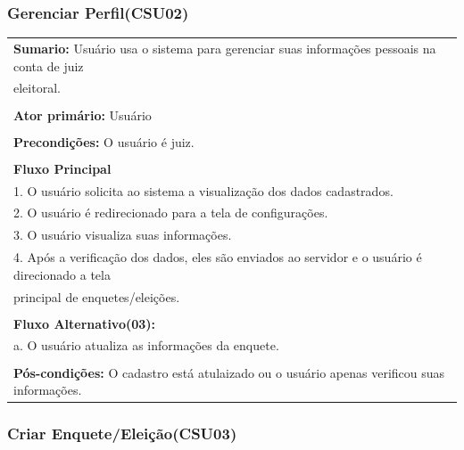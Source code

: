 \documentclass[a4paper,12pt]{report}
\begin{document}
\begin{center}
	{\subsubsection*{Gerenciar Perfil(CSU02)}}
\end{center}
\markright{}
\begin{tabularx}{\textwidth}{|X|}\hline
	{\textbf{Sumario:}} Usuário usa o sistema para gerenciar suas informações pessoais na conta de juiz\\ eleitoral. \\\\
	{\textbf{Ator primário:}} Usuário \\\\
	{\textbf{Precondições:}} O usuário é juiz.\\\\
	{\textbf{Fluxo Principal}}\\
	1. O usuário solicita ao sistema a visualização dos dados cadastrados.\\
	2. O usuário é redirecionado para a tela de configurações. \\
	3. O usuário visualiza suas informações. \\
	4. Após a verificação dos dados, eles são enviados ao servidor e o usuário é direcionado a tela\\ principal de enquetes/eleições.\\\\
	{\textbf{Fluxo Alternativo(03):}}\\
	a. O usuário atualiza as informações da enquete.\\\\
	{\textbf{Pós-condições:}} O cadastro está atulaizado ou o usuário apenas verificou suas informações.\\
	\hline
\end{tabularx}
\newpage
\begin{center}
	{\subsubsection*{Criar Enquete/Eleição(CSU03)}}
\end{center}
\markright{}
\end{document}
